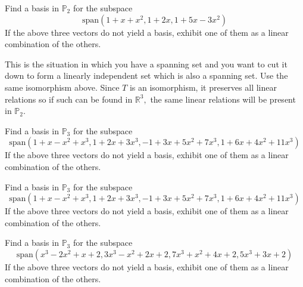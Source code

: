 \documentclass{ximera}
\begin{document}
\begin{problem}\label{prb:10.29} Find a basis in $\mathbb{P}_{2}$ for the subspace
\begin{equation*}
\mbox{span}\left( 1+x+x^{2},1+2x,1+5x-3x^{2}\right)
\end{equation*}
If the above three vectors do not yield a basis, exhibit one of them as a
linear combination of the others. 
\begin{hint}
This is the situation in
which you have a spanning set and you want to cut it down to form a linearly
independent set which is also a spanning set. Use the same isomorphism
above. Since $T$ is an isomorphism, it preserves all linear relations so if
such can be found in $\mathbb{R}^{3},$ the same linear relations will be
present in $\mathbb{P}_{2}$.
\end{hint}
\end{problem}


\begin{problem}\label{prb:10.30} Find a basis in $\mathbb{P}_{3}$ for the subspace
\begin{equation*}
\mbox{span}\left(
1+x-x^{2}+x^{3},1+2x+3x^{3},-1+3x+5x^{2}+7x^{3},1+6x+4x^{2}+11x^{3}\right)
\end{equation*}
If the above three vectors do not yield a basis, exhibit one of them as a
linear combination of the others.
\end{problem}


\begin{problem}\label{prb:10.31} Find a basis in $\mathbb{P}_{3}$ for the subspace
\begin{equation*}
\mbox{span}\left(
1+x-x^{2}+x^{3},1+2x+3x^{3},-1+3x+5x^{2}+7x^{3},1+6x+4x^{2}+11x^{3}\right)
\end{equation*}
If the above three vectors do not yield a basis, exhibit one of them as a
linear combination of the others.
\end{problem}


\begin{problem}\label{prb:10.32} Find a basis in $\mathbb{P}_{3}$ for the subspace
\begin{equation*}
\mbox{span}\left(
x^{3}-2x^{2}+x+2,3x^{3}-x^{2}+2x+2,7x^{3}+x^{2}+4x+2,5x^{3}+3x+2\right)
\end{equation*}
If the above three vectors do not yield a basis, exhibit one of them as a
linear combination of the others.
\end{problem}
\end{document}
